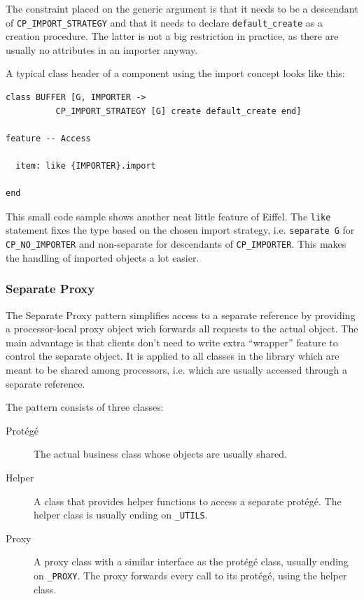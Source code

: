 The constraint placed on the generic argument is that it needs to be a descendant of \lstinline!CP_IMPORT_STRATEGY! and that it needs to declare \lstinline!default_create! as a creation procedure.
The latter is not a big restriction in practice, as there are usually no attributes in an importer anyway.

A typical class header of a component using the import concept looks like this:
\begin{lstlisting}[language=OOSC2Eiffel, captionpos=b, caption={An example component with import.}]
class BUFFER [G, IMPORTER -> 
          CP_IMPORT_STRATEGY [G] create default_create end]

feature -- Access

  item: like {IMPORTER}.import

end
\end{lstlisting}

This small code sample shows another neat little feature of Eiffel.
The \lstinline!like! statement fixes the type based on the chosen import strategy, i.e. \lstinline!separate G! for \lstinline!CP_NO_IMPORTER! and non-separate for descendants of \lstinline!CP_IMPORTER!.
This makes the handling of imported objects a lot easier.

\subsubsection{Separate Proxy}
\label{sec:separate-proxy}

The Separate Proxy pattern  simplifies access to a separate reference by providing a processor-local proxy object wich forwards all requests to the actual object.
The main advantage is that clients don't need to write extra ``wrapper'' feature to control the separate object.
It is applied to all classes in the library which are meant to be shared among processors, i.e. which are usually accessed through a separate reference.

The pattern consists of three classes:
\begin{description}
 \item [Protégé] The actual business class whose objects are usually shared.
 \item [Helper] A class that provides helper functions to access a separate protégé.
  The helper class is usually ending on \lstinline!_UTILS!.
 \item [Proxy] A proxy class with a similar interface as the protégé class, usually ending on \lstinline!_PROXY!.
    The proxy forwards every call to its protégé, using the helper class.
\end{description}

